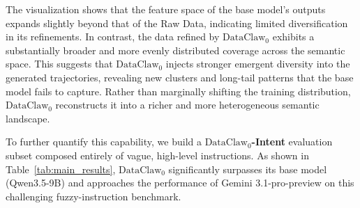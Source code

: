 \documentclass{llmxive}
\begin{document}
The visualization shows that the feature space of the base model’s outputs expands slightly beyond that of the Raw Data, 
indicating limited diversification in its refinements. 
In contrast, the data refined by $\text{DataClaw}_0$ exhibits a substantially broader and more evenly distributed coverage across the semantic space. 
This suggests that $\text{DataClaw}_0$ injects stronger emergent diversity into the generated trajectories, 
revealing new clusters and long-tail patterns that the base model fails to capture. 
Rather than marginally shifting the training distribution, 
$\text{DataClaw}_0$ reconstructs it into a richer and more heterogeneous semantic landscape.

To further quantify this capability, we build a \textbf{$\text{DataClaw}_0$-Intent} evaluation subset composed entirely of vague, high-level instructions. 
As shown in Table~\ref{tab:main_results}, $\text{DataClaw}_0$ significantly surpasses its base model (Qwen3.5-9B) 
and approaches the performance of Gemini 3.1-pro-preview on this challenging fuzzy-instruction benchmark.





\end{document}

